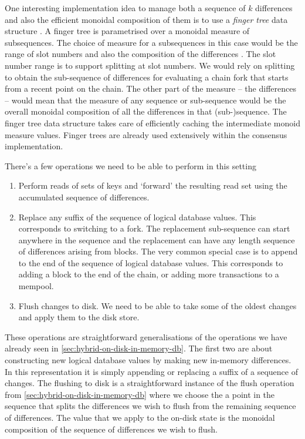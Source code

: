 \documentclass[11pt,a4paper]{article}
\begin{document}
One interesting implementation idea to manage both a sequence of $k$ differences
and also the efficient monoidal composition of them is to use a \emph{finger
tree} data structure \citep{fingertree}. A finger tree is parametrised over a
monoidal measure of subsequences. The choice of measure for a subsequences in
this case would be the range of slot numbers and also the composition of the
differences . The slot number range is to support splitting at slot numbers. We
would rely on splitting to obtain the sub-sequence of differences for
evaluating a chain fork that starts from a recent point on the chain. The other
part of the measure -- the differences -- would mean that the measure of any
sequence or sub-sequence would be the overall monoidal composition of all the
differences in that (sub-)sequence. The finger tree data structure takes care
of efficiently caching the intermediate monoid measure values. Finger trees are
already used extensively within the consensus implementation.

There's a few operations we need to be able to perform in this setting
\begin{enumerate}
\item Perform reads of sets of keys and `forward' the resulting read set
      using the accumulated sequence of differences.
\item Replace any suffix of the sequence of logical database values. This
      corresponds to switching to a fork. The replacement sub-sequence can
      start anywhere in the sequence and the replacement can have any length
      sequence of differences arising from blocks. The very common special case
      is to append to the end of the sequence of logical database values.
      This corresponds to adding a block to the end of the chain, or adding
      more transactions to a mempool.
\item Flush changes to disk. We need to be able to take some of the oldest
      changes and apply them to the disk store.
\end{enumerate}
These operations are straightforward generalisations of the operations we have
already seen in \cref{sec:hybrid-on-disk-in-memory-db}. The first two are about
constructing new logical database values by making new in-memory differences.
In this representation it is simply appending or replacing a suffix of a
sequence of changes. The flushing to disk is a straightforward instance of the
flush operation from \cref{sec:hybrid-on-disk-in-memory-db} where we choose the
a point in the sequence that splits the differences we wish to flush from the
remaining sequence of differences. The value that we apply to the on-disk state
is the monoidal composition of the sequence of differences we wish to flush.
\end{document}
